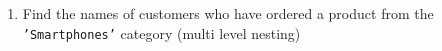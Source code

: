 \documentclass[12pt,a4paper]{article}
\begin{document}
\begin{enumerate}


    \item Find the names of customers who have ordered a product from the \texttt{'Smartphones'} category (multi level nesting)




\end{enumerate}
\end{document}
